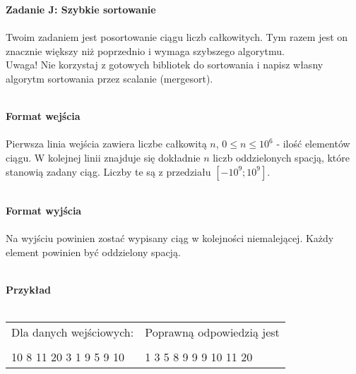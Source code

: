\documentclass[
  fontsize=12pt  %
 ,english        %
 ,headinclude    %
 ,headsepline    %
]{scrbook}       %
\begin{document}
\vspace{50 mm}
\hspace{50 mm}
\newline

\par{\Large \textbf{Zadanie J: Szybkie sortowanie}} \\ \\
Twoim zadaniem jest posortowanie ciągu liczb całkowitych. Tym razem jest on znacznie większy niż poprzednio i wymaga szybszego algorytmu. 
\\
Uwaga! Nie korzystaj z gotowych bibliotek do sortowania i napisz własny algorytm sortowania przez scalanie (mergesort).
\\ \\
\par{\Large \textbf{Format wejścia}} \\ \\
Pierwsza linia wejścia zawiera liczbe całkowitą $n$, $0 \leq n \leq 10^6$ - ilość elementów ciągu. W kolejnej linii znajduje się dokładnie $n$ liczb oddzielonych spacją, które stanowią zadany ciąg. Liczby te są z przedziału $[-10^9; 10^9]$.
\\ \\
\par{\Large \textbf{Format wyjścia}} \\ \\
Na wyjściu powinien zostać wypisany ciąg w kolejności niemalejącej. Każdy element powinien być oddzielony spacją.
\\ \\
\par{\Large \textbf{Przykład}} \\ \\
\begin{tabular}{ p{7cm} p{7cm} }

  Dla danych wejściowych: \hspace{40mm}& Poprawną odpowiedzią jest \\
& \\

10 \newline
9 8 11 20 3 1 9 5 9 10 \newline

&   
1 3 5 8 9 9 9 10 11 20 \newline

\\

\end{tabular}
\end{document}
